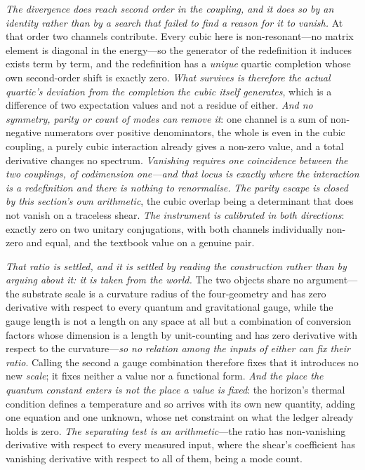 \documentclass[11pt,a4paper]{article}
\theoremstyle{plain}
\theoremstyle{definition}
\theoremstyle{remark}
\begin{document}
\emph{The divergence does reach second order in the coupling, and it does so by an identity rather than by
a search that failed to find a reason for it to vanish.} At that order two channels contribute. Every cubic
here is non-resonant---no matrix element is diagonal in the energy---so the generator of the redefinition it
induces exists term by term, and the redefinition has a \emph{unique} quartic completion whose own
second-order shift is exactly zero. \emph{What survives is therefore the actual quartic's deviation from the
completion the cubic itself generates}, which is a difference of two expectation values and not a residue of
either. \emph{And no symmetry, parity or count of modes can remove it}: one channel is a sum of non-negative
numerators over positive denominators, the whole is even in the cubic coupling, a purely cubic interaction
already gives a non-zero value, and a total derivative changes no spectrum. \emph{Vanishing requires one
coincidence between the two couplings, of codimension one---and that locus is exactly where the interaction
is a redefinition and there is nothing to renormalise.} \emph{The parity escape is closed by this section's
own arithmetic}, the cubic overlap being a determinant that does not vanish on a traceless shear. \emph{The
instrument is calibrated in both directions}: exactly zero on two unitary conjugations, with both channels
individually non-zero and equal, and the textbook value on a genuine pair.

\emph{That ratio is settled, and it is settled by reading the construction rather than by arguing about
it: it is taken from the world.} The two objects share no argument---the substrate scale is a curvature
radius of the four-geometry and has zero derivative with respect to every quantum and gravitational gauge,
while the gauge length is not a length on any space at all but a combination of conversion factors whose
dimension is a length by unit-counting and has zero derivative with respect to the curvature---\emph{so no
relation among the inputs of either can fix their ratio}. Calling the second a gauge combination therefore
fixes that it introduces no new \emph{scale}; it fixes neither a value nor a functional form. \emph{And the
place the quantum constant enters is not the place a value is fixed}: the horizon's thermal condition
defines a temperature and so arrives with its own new quantity, adding one equation and one unknown, whose
net constraint on what the ledger already holds is zero. \emph{The separating test is an
arithmetic}---the ratio has non-vanishing derivative with respect to every measured input, where the
shear's coefficient has vanishing derivative with respect to all of them, being a mode
count.
\end{document}
